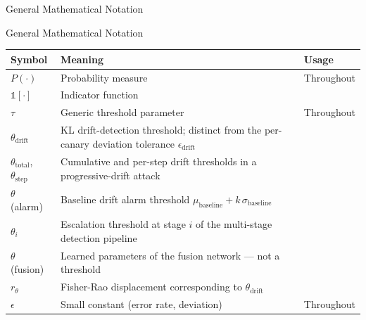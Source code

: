 \documentclass[
  ignorenonframetext,
]{beamer}
\newcounter{none} %
\providecommand{\cref}[1]{\texttt{\detokenize{#1}}}
\begin{document}
\begin{frame}[allowframebreaks]{General Mathematical Notation}
\protect{}\label{general-mathematical-notation}
\end{frame}

\begin{frame}[allowframebreaks]{General Mathematical Notation}
{\def\LTcaptype{none} %
\begin{longtable}[]{@{}
  >{\raggedright\arraybackslash}p{}
  >{\raggedright\arraybackslash}p{}
  >{\raggedright\arraybackslash}p{}@{}}
\toprule\noalign{}
\begin{minipage}[b]{\linewidth}\raggedright
Symbol
\end{minipage} & \begin{minipage}[b]{\linewidth}\raggedright
Meaning
\end{minipage} & \begin{minipage}[b]{\linewidth}\raggedright
Usage
\end{minipage} \\
\midrule\noalign{}
\endhead
\(P(\cdot)\) & Probability measure & Throughout \\
\(\mathbb{1}[\cdot]\) & Indicator function &
\cref{eq:decision-fusion} \\
\(\tau\) & Generic threshold parameter & Throughout \\
\(\theta_{\text{drift}}\) & KL drift-detection threshold; distinct from
the per-canary deviation tolerance \(\epsilon_{\text{drift}}\) &
\cref{eq:drift-detection} \\
\(\theta_{\text{total}}\), \(\theta_{\text{step}}\) & Cumulative and
per-step drift thresholds in a progressive-drift attack &
\cref{def:progressive-drift} \\
\(\theta\) (alarm) & Baseline drift alarm threshold
\(\mu_{\text{baseline}} + k\,\sigma_{\text{baseline}}\) &
\cref{prop:drift-threshold} \\
\(\theta_i\) & Escalation threshold at stage \(i\) of the multi-stage
detection pipeline & \cref{def:multi-stage} \\
\(\theta\) (fusion) & Learned parameters of the fusion network --- not a
threshold & \cref{eq:learned-fusion} \\
\(r_\theta\) & Fisher-Rao displacement corresponding to
\(\theta_{\text{drift}}\) & \cref{rem:geometric-bound} \\
\(\epsilon\) & Small constant (error rate, deviation) & Throughout \\

\end{longtable}}
\end{frame}
\end{document}
